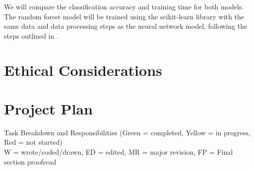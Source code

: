 \documentclass{article} %
\begin{document}
We will compare the classification accuracy and training time for both models. The random forest model will be trained using the scikit-learn library with the same data and data processing steps as the neural network model, following the steps outlined in \cite{Shafl.RandomForestClassification.2023}.

\section{Ethical Considerations}

\section{Project Plan}
Task Breakdown and Responsibilities (Green = completed, Yellow = in progress, Red = not started)\\
W = wrote/coded/drawn, ED = edited, MR = major revision, FP = Final section proofread
\end{document}
